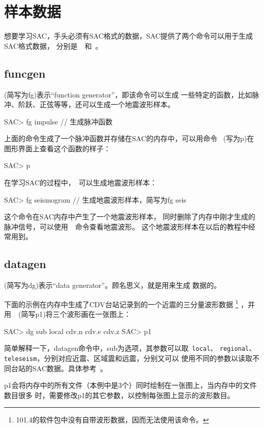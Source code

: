\section{样本数据}
想要学习SAC，手头必须有SAC格式的数据，SAC提供了两个命令可以用于生成SAC格式数据，
分别是~~和~。

\subsection{funcgen}
(简写为fg)表示``function generator''，即该命令可以生成
一些特定的函数，比如脉冲、阶跃、正弦等等，还可以生成一个地震波形样本。
\begin{SACCode}
SAC> fg impulse         // 生成脉冲函数
\end{SACCode}
上面的命令生成了一个脉冲函数并存储在SAC的内存中，可以用命令~
(写为p)在图形界面上查看这个函数的样子：
\begin{SACCode}
SAC> p
\end{SACCode}

在学习SAC的过程中，~可以生成地震波形样本：
\begin{SACCode}
SAC> fg seismogram      // 生成地震波形样本，简写为fg seis
\end{SACCode}
这个命令在SAC内存中产生了一个地震波形样本，
同时删除了内存中刚才生成的脉冲信号，可以使用~~命令查看地震波形。
这个地震波形样本在以后的教程中经常用到。

\subsection{datagen}
(简写为dg)表示``data generator''。顾名思义，就是用来生成
数据的。

下面的示例在内存中生成了CDV台站记录到的一个近震的三分量波形数据
\footnote{101.4的软件包中没有自带波形数据，因而无法使用该命令。}
，并用~~(简写p1)将三个波形画在一张图上：
\begin{SACCode}
SAC> dg sub local cdv.n cdv.e cdv.z
SAC> p1
\end{SACCode}
简单解释一下，datagen命令中，sub为选项，其参数可以取~\verb+local+、
\verb+regional+、\verb+teleseism+，分别对应近震、区域震和远震，分别又可以
使用不同的参数以读取不同台站的SAC数据。具体参考~。

p1会将内存中的所有文件（本例中是3个）同时绘制在一张图上，当内存中的文件数目很多
时，需要修改p1的其它参数，以控制每张图上显示的波形数目。
